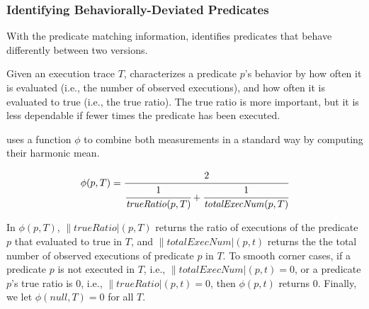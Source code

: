 %

\subsubsection{Identifying Behaviorally-Deviated Predicates}
\label{sec:identify_diff}

With the predicate matching information, \ourtool 
identifies predicates that behave differently
between two versions. 

Given an execution trace $\mathit{T}$,
\ourtool characterizes a predicate $\mathit{p}$'s behavior by how often
it is evaluated (i.e., the number of observed executions),
and how often it is evaluated to true (i.e., the true ratio).
The true ratio is more important, but it is less dependable
if fewer times the predicate has been executed.

\ourtool uses a function $\phi$ to combine both measurements
in a standard way by computing their harmonic mean.


\vspace{-2mm}

\begin{equation*}
 \|\phi|(p, T)= \cfrac{2}{\cfrac{1}{\|trueRatio|(p, T)} + \cfrac{1}{\|totalExecNum|(p, T)}}
\end{equation*}

\vspace{-1mm}

In $\phi(p, T)$, $\|trueRatio|(p, T)$ returns the ratio of executions of the
predicate $p$ that evaluated to true in $T$,
and $\|totalExecNum|(p, t)$ returns the the total
number of observed executions of predicate $p$ in $T$.
To smooth corner cases, if a predicate $p$ is not executed in $T$, 
i.e., $\|totalExecNum|(p, t) = 0$, or
a predicate $p$'s true ratio is 0, i.e., $\|trueRatio|(p, t) = 0$,
then $\phi(p, t)$ returns 0.
Finally, we let $\phi(null, T) = 0$ for all $T$.


